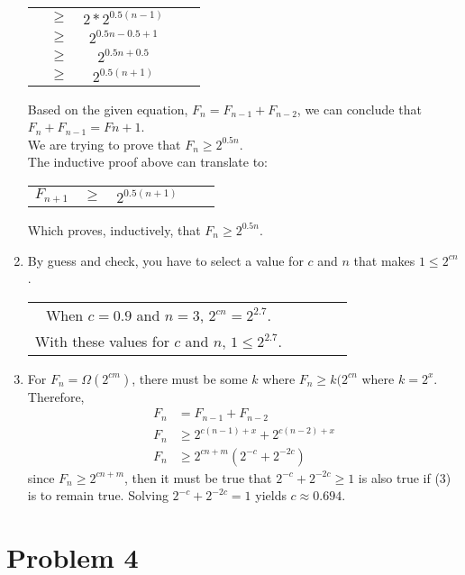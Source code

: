 \documentclass{article}
\begin{document}
\begin{enumerate}[label=(\alph*)]
\begin{center}
\begin{tabular} {c c c c c}
            &$\geq$ &$2*2^{0.5(n-1)}$\\
            &$\geq$ &$2^{0.5n-0.5+1}$\\
            &$\geq$ &$2^{0.5n+0.5}$\\
            &$\geq$ &$2^{0.5(n+1)}$\\
        \end{tabular}
    \end{center}
    Based on the given equation, $F_{n}=F_{n-1}+F_{n-2}$, we can conclude that $F_n+F_{n-1}=F{n+1}$.\\
    We are trying to prove that $F_n \geq2 ^{0.5n}$.\\
    The inductive proof above can translate to:
    \begin{center}
    	\begin{tabular}{c c c c c}
    	$F_{n+1}$ &$\geq$ &$2^{0.5(n+1)}$\\
    	\end{tabular}
    \end{center}
    Which proves, inductively, that $F_n\geq2 ^{0.5n}$.\\
	\item By guess and check, you have to select a value for $c$ and $n$ that makes $1\leq 2^{cn}$.\\
    \begin{center}
    	\begin{tabular}{c c c c c}
    	When $c=0.9$ and $n=3$, $2^{cn}=2^{2.7}$.\\
        With these values for $c$ and $n$, $1\leq2^{2.7}$.\\
    	\end{tabular}
    \end{center}
	\item For \(F_n = \Omega(2^{cm})\), there must be some $k$ where \(F_n \geq k(2^{cn}\) where $k = 2^x$. Therefore,
    \begin{align}
    	F_n &= F_{n-1} + F_{n-2} \\
        F_n &\geq 2^{c(n-1)+x} + 2^{c(n-2)+x} \\
        F_n &\geq 2^{cn+m}(2^{-c}+2^{-2c})
  \end{align}
  since \(F_n \geq 2^{cn+m}\), then it must be true that \(2^{-c}+2^{-2c} \geq 1\) is also true if (3) is to remain true. Solving \(2^{-c}+2^{-2c} = 1\) yields $c \approx 0.694$.
\end{enumerate}
\section*{Problem 4}
\end{document}
